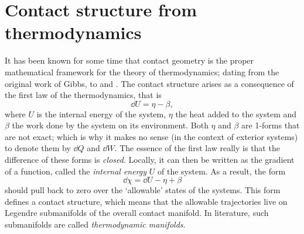 \section{Contact structure from thermodynamics}
\label{sec:thermodynamics}
It has been known for some time that contact geometry is the proper mathematical framework for the theory of thermodynamics; dating from the original work of Gibbs, to \citet{Arnold1989b} and \citet{Hermann1973}. The contact structure arises as a consequence of the first law of the thermodynamics, that is
\begin{equation}
    \dd{U} = \eta - \beta,
    \label{eq:thermo_first_law}
\end{equation}
where $U$ is the internal energy of the system, $\eta$ the heat added to the system and $\beta$ the work done by the system on its environment. Both $\eta$ and $\beta$ are 1-forms that are not exact; which is why it makes no sense (in the context of exterior systems) to denote them by $\dd{Q}$ and $\dd{W}$. The essence of the first law really is that the difference of these forms is \emph{closed}. Locally, it can then be written as the gradient of a function, called the \emph{internal energy} $U$ of the system. As a result, the form 
$$ \dd{\chi} = \dd{U} - \eta + \beta $$
should pull back to zero over the `allowable' states of the systems. This form defines a contact structure, which means that the allowable trajectories live on Legendre submanifolds of the overall contact manifold. \cite{Frankel2012,Bamberg1988} In literature, such submanifolds are called \emph{thermodynamic manifolds}.

